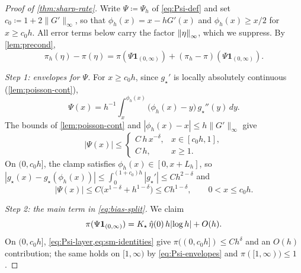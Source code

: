 \documentclass[aap,preprint]{imsart}
\DeclarePairedDelimiter{\Vpair}{\|}{\|} %
\DeclarePairedDelimiter{\vpair}{|}{|} %
\newcommand\norm[2][0pt]{\Vpair*{#2}} %
\newcommand\snorm[1]{\norm{\smash{#1}}} %
\newcommand\abs[2][0pt]{\vpair*{#2}} %
\numberwithin{equation}{section}
\theoremstyle{plain}
\theoremstyle{definition}
\begin{document}
\begin{proof}[Proof of \cref{thm:sharp-rate}]
  Write $\Psi\coloneqq \Psi_h$ of \cref{eq:Psi-def} and set $c_0\coloneqq 1+2\|G'\|_\infty$, so that $\phi_h(x)=x-hG'(x)$ and $\phi_h(x)\ge x/2$ for $x\ge c_0h$.  All error terms below carry the factor $\snorm{\eta}_\infty$, which we suppress.  By \cref{lem:precond},
  \begin{equation}\label{eq:bias-split}
    \pi_h(\eta)-\pi(\eta)=\pi(\Psi\mathbf 1_{(0,\infty)})+(\pi_h-\pi)(\Psi\mathbf 1_{(0,\infty)}) .
  \end{equation}

  \emph{Step 1: envelopes for $\Psi$.}  For $x\ge c_0h$, since $g_\star'$ is locally absolutely continuous (\cref{lem:poisson-cont}),
  \begin{equation}\label{eq:Psi-int-rem}
    \Psi(x)=h^{-1}\int_x^{\phi_h(x)}\bigl(\phi_h(x)-y\bigr)\,g_\star''(y)\,dy.
  \end{equation}
  The bounds of \cref{lem:poisson-cont} and $|\phi_h(x)-x|\le h\|G'\|_\infty$ give
  \begin{equation}\label{eq:Psi-envelopes}
    |\Psi(x)|\le
    \begin{cases}
          C\,h\,x^{-\delta},&  x\in[c_0 h,1],\\
       C\,h,&  x\ge1.
    \end{cases} 
  \end{equation}
  On $(0,c_0h]$, the clamp satisfies $\phi_h(x)\in[0,x+L_h]$, so $|g_\star(x)-g_\star(\phi_h(x))|\le\int_0^{(1+c_0)h}|g_\star'|\le Ch^{2-\delta}$ and
  \begin{equation}\label{eq:Psi-layer}
    |\Psi(x)|\le C\bigl(x^{1-\delta}+h^{1-\delta}\bigr)\le Ch^{1-\delta},\qquad 0<x\le c_0h .
  \end{equation}

  \emph{Step 2: the main term in \cref{eq:bias-split}.}  We claim
  \begin{equation}\label{eq:main-term}
    \pi(\Psi\mathbf 1_{(0,\infty)})=K_\star\,\hat\eta(0)\,h\abs{\log h } +O(h).
  \end{equation}
  On $(0,c_0h]$, \cref{eq:Psi-layer,eq:sm-identities} give $\pi((0,c_0h])\le Ch^\delta$ and an $O(h)$ contribution; the same holds on $[1,\infty)$ by \cref{eq:Psi-envelopes} and $\pi([1,\infty))\le1$.  
  

\end{proof}
\end{document}
